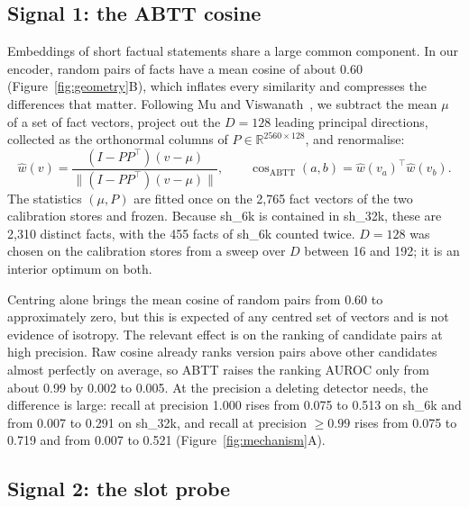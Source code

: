 \documentclass[journal=jcisd8,manuscript=article]{achemso}
\newcommand{\sub}[1]{\textsf{sh\_#1}}                    %
\begin{document}
\subsection{Signal 1: the ABTT cosine}
\label{sec:abtt}

Embeddings of short factual statements share a large common component. In our encoder, random pairs of facts have a mean cosine of about 0.60 (Figure~\ref{fig:geometry}B), which inflates every similarity and compresses the differences that matter. Following Mu and Viswanath~\cite{mu2018abtt}, we subtract the mean $\mu$ of a set of fact vectors, project out the $D=128$ leading principal directions, collected as the orthonormal columns of $P\in\mathbb{R}^{2560\times128}$, and renormalise:
\begin{equation}
\hat w(v)=\frac{(I-PP^{\top})(v-\mu)}{\lVert (I-PP^{\top})(v-\mu)\rVert},\qquad
\cos_{\mathrm{ABTT}}(a,b)=\hat w(v_a)^{\top}\hat w(v_b).
\end{equation}
The statistics $(\mu,P)$ are fitted once on the 2,765 fact vectors of the two calibration stores and frozen. Because \sub{6k} is contained in \sub{32k}, these are 2,310 distinct facts, with the 455 facts of \sub{6k} counted twice. $D=128$ was chosen on the calibration stores from a sweep over $D$ between 16 and 192; it is an interior optimum on both.

Centring alone brings the mean cosine of random pairs from 0.60 to approximately zero, but this is expected of any centred set of vectors and is not evidence of isotropy. The relevant effect is on the ranking of candidate pairs at high precision. Raw cosine already ranks version pairs above other candidates almost perfectly on average, so ABTT raises the ranking AUROC only from about 0.99 by 0.002 to 0.005. At the precision a deleting detector needs, the difference is large: recall at precision 1.000 rises from 0.075 to 0.513 on \sub{6k} and from 0.007 to 0.291 on \sub{32k}, and recall at precision $\ge0.99$ rises from 0.075 to 0.719 and from 0.007 to 0.521 (Figure~\ref{fig:mechanism}A).

\subsection{Signal 2: the slot probe}
\label{sec:probe}
\end{document}
